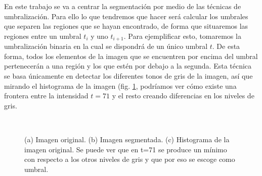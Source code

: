 En este trabajo se va a centrar la segmentación por medio de las técnicas de umbralización. Para ello lo que tendremos que hacer será calcular los umbrales que separen las regiones que se hayan encontrado, de forma que situaremos las regiones entre un umbral $t_{i}$ y uno $t_{i+1}$. Para ejemplificar esto, tomaremos la umbralización binaria en la cual se dispondrá de un único umbral $t$. De esta forma, todos los elementos de la imagen que se encuentren por encima del umbral pertenecerán a una región  y los que estén por debajo a la segunda. Esta técnica se basa únicamente en detectar los diferentes tonos de gris de la imagen, así que mirando el histograma de la imagen (fig. \ref{img:rice}, podríamos ver cómo existe una frontera entre la intensidad $t=71$ y el resto creando diferencias en los niveles de gris. \cite{art:refbarrenechea}

\begin{figure}
\centering
	\\
	\caption{(a) Imagen original. (b) Imagen segmentada. (c) Histograma de la imagen original. Se puede ver que en t=71 se produce un mínimo con respecto a los otros niveles de gris y que por eso se escoge como umbral.}
	\label{img:rice}
\end{figure}


